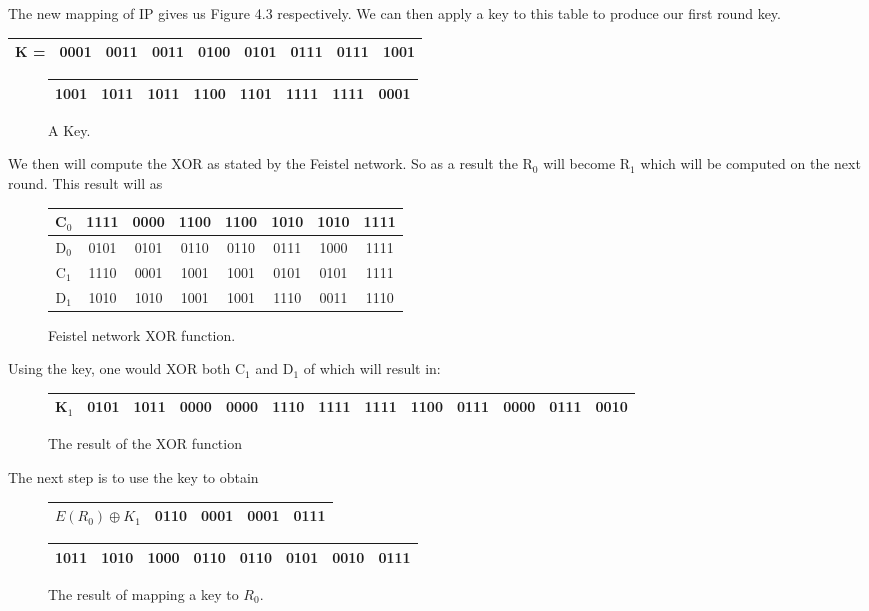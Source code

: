 \documentclass[11pt,a4paper, notitlepage]{report}
\begin{document}
The new mapping of IP gives us Figure 4.3 respectively. We can then apply a key to this table to produce our first round key.


\begin{tabular}{|c|c|c|c|c|c|c|c|c|} \hline
K = & 0001 & 0011 & 0011 & 0100 & 0101 & 0111 & 0111 & 1001
\\ \hline
\end{tabular}
\begin{figure}[H]
\centering
\label{tab:KeyExample}
\begin{tabular}{|c|c|c|c|c|c|c|c|} \hline
1001 & 1011 & 1011 & 1100 & 1101 & 1111 & 1111 & 0001\\ \hline
\end{tabular}
\caption{A Key.}
\end{figure}
We then will compute the XOR as stated by the Feistel network. So as a result the R$_{0}$ will become R$_{1}$ which will be computed on the next round.
This result will as


\begin{figure}[H]
\centering
\label{tab:XORFN}
\begin{tabular}{|c|c|c|c|c|c|c|c|} \hline
C$_{0}$ & 1111 & 0000 & 1100 & 1100 & 1010 & 1010 & 1111\\ \hline
D$_{0}$ & 0101 & 0101 & 0110 & 0110 & 0111 & 1000 & 1111\\ \hline
C$_{1}$ & 1110 & 0001 & 1001 & 1001 & 0101 & 0101 & 1111\\ \hline
D$_{1}$ & 1010 & 1010 & 1001 & 1001 & 1110 & 0011 & 1110\\ \hline
\end{tabular}
\caption{Feistel network XOR function.}
\end{figure}

Using the key, one would XOR both C$_{1}$ and D$_{1}$ of which will result in:


\begin{figure}[H]
\centering
\label{tab:Roundmapping}
\begin{tabular}{|c|c|c|c|c|c|c|c|c|c|c|c|c|}\hline
K$_{1}$ & 0101 & 1011 & 0000 & 0000 & 1110 & 1111 & 1111 & 1100 & 0111 & 0000 & 0111 & 0010\\ \hline
\end{tabular}
\caption{The result of the XOR function }
\end{figure}

The next step is to use the key to obtain

\begin{figure}[H]
\label{tab:XORR0K}
\begin{tabular}{|c|c|c|c|c|}\hline
$E(R_{0}) \oplus K_{1}$ & 0110 & 0001 & 0001 & 0111\\ \hline
\end{tabular}

\indent \begin{tabular}{|c|c|c|c|c|c|c|c|}\hline
1011 & 1010 & 1000 & 0110 & 0110 & 0101 & 0010 & 0111\\ \hline
\end{tabular}
\caption{The result of mapping a key to $R_{0}$.}
\end{figure}
\end{document}

